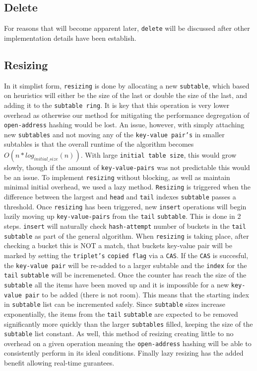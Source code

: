 \subsection{Delete}
For reasons that will become apparent later, \texttt{delete} will be
discussed after other implementation details have been establish.

\subsection{Resizing}
In it simplist form, \texttt{resizing} is done by allocating a new
\texttt{subtable}, which based on heuristics will either be the size
of the last or double the size of the last, and adding it to the
\texttt{subtable ring}. It is key that this operation is very lower
overhead as otherwise our method for mitigating the performance
degregation of \texttt{open-address} hashing would be lost. An issue,
however, with simply attaching new \texttt{subtables} and not moving
any of the \texttt{key-value pair's} in smaller subtables is that the
overall runtime of the algorithm becomes
$O(n*log_{initial\_size}(n))$. With large \texttt{initial table size},
this would grow slowly, though if the amount of
\texttt{key-value-pairs} was not predictable this would be an
issue. To implement \texttt{resizing} without blocking, as well as
maintain minimal initial overhead, we used a lazy
method. \texttt{Resizing} is triggered when the difference between the
largest and \texttt{head} and \texttt{tail} indexes \texttt{subtable}
passes a threshold. Once \texttt{resizing} has been triggered, new
\texttt{insert} operations will begin lazily moving up
\texttt{key-value-pairs} from the \texttt{tail}
\texttt{subtable}. This is done in 2 steps. \texttt{insert} will
naturally check \texttt{hash-attempt} number of buckets in the
\texttt{tail} \texttt{subtable} as part of the general algorithm. When
\texttt{resizing} is taking place, after checking a bucket this is NOT
a match, that buckets key-value pair will be marked by setting the
\texttt{triplet's} \texttt{copied flag} via a \texttt{CAS}. If the
\texttt{CAS} is succesful, the \texttt{key-value pair} will be
re-added to a larger subtable and the \texttt{index} for the
\texttt{tail} \texttt{subtable} will be incremeneted. Once the counter
has reach the size of the \texttt{subtable} all the items have been
moved up and it is impossible for a new \texttt{key-value pair} to be
added (there is not room). This means that the starting index in
\texttt{subtable} list can be incremented safely. Since
\texttt{subtable} sizes increase exponentially, the items from the
\texttt{tail} \texttt{subtable} are expected to be removed
significantly more quickly than the larger \texttt{subtables} filled,
keeping the size of the \texttt{subtable} list constant. As well, this
method of resizing creating little to no overhead on a given operation
meaning the \texttt{open-address} hashing will be able to consistently
perform in its ideal conditions. Finally lazy resizing has the added
benefit allowing real-time gurantees.

